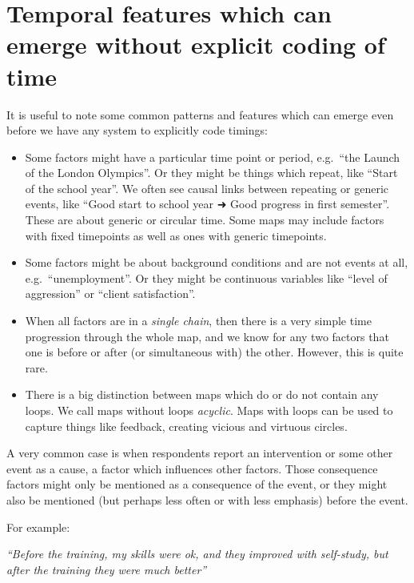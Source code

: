 \documentclass[
]{book}
\begin{document}
\hypertarget{temporal-features-which-can-emerge-without-explicit-coding-of-time}{%
\section{Temporal features which can emerge without explicit coding of time}\label{temporal-features-which-can-emerge-without-explicit-coding-of-time}}

It is useful to note some common patterns and features which can emerge even before we have any system to explicitly code timings:

\begin{itemize}
\item
  Some factors might have a particular time point or period, e.g.~``the Launch of the London Olympics''. Or they might be things which repeat, like ``Start of the school year''. We often see causal links between repeating or generic events, like ``Good start to school year ➜ Good progress in first semester''. These are about generic or circular time. Some maps may include factors with fixed timepoints as well as ones with generic timepoints.
\item
  Some factors might be about background conditions and are not events at all, e.g.~``unemployment''. Or they might be continuous variables like ``level of aggression'' or ``client satisfaction''.
\item
  When all factors are in a \emph{single chain}, then there is a very simple time progression through the whole map, and we know for any two factors that one is before or after (or simultaneous with) the other. However, this is quite rare.
\item
  There is a big distinction between maps which do or do not contain any loops. We call maps without loops \emph{acyclic}. Maps with loops can be used to capture things like feedback, creating vicious and virtuous circles.
\end{itemize}

A very common case is when respondents report an intervention or some other event as a cause, a factor which influences other factors. Those consequence factors might only be mentioned as a consequence of the event, or they might also be mentioned (but perhaps less often or with less emphasis) before the event.

For example:

\emph{``Before the training, my skills were ok, and they improved with self-study, but after the training they were much better''}
\end{document}
